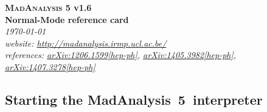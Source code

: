 \documentclass[a4paper]{article}
\newcommand{\MAnorm}{{MadAnalysis}~5}
\begin{document}
\begin{center} 
{\color{ao} \huge \textbf{\textsc{MadAnalysis} 5 v1.6}} \\ \vspace{0.25cm}
{\color{ao} \huge \textbf{Normal-Mode reference card}} \\ \vspace{0.25cm}
\vspace{0.1cm} \textsl{\today}\\
\vspace{0.1cm} \textsl{website: \url{http://madanalysis.irmp.ucl.ac.be/}}\\
\vspace{0.1cm} \textsl{references: \href{https://arxiv.org/abs/1206.1599}{arXiv:1206.1599[hep-ph]}, \href{https://arxiv.org/abs/1405.3982}{arXiv:1405.3982[hep-ph]}, \href{https://arxiv.org/abs/1407.3278}{arXiv:1407.3278[hep-ph]}}
\end{center}

\hspace{0.5cm}

\begin{shaded}
\section{\Large Starting the \MAnorm\ interpreter}
\end{shaded}
\end{document}
